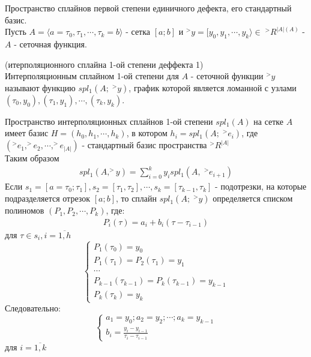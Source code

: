\documentclass[__main__.tex]{subfiles}
\begin{document}
	Пространство сплайнов первой степени единичного дефекта, его стандартный базис.\\
	
	Пусть $A = \langle a=\tau_0,\tau_1,\cdots,\tau_k = b \rangle$ - сетка $[a;b]$ и $^>y = [y_0, y_1, \cdots, y_k \rangle \in\;^>R^{|A|(A)}$ - $A$ - сеточная функция.
	\begin{definition}
		(итерполяционного сплайна 1-ой степени деффекта 1)\\
		Интерполяционным сплайном 1-ой степени для $A$ - сеточной функции $^>y$ называют функцию $spl_1\left(A;\;^>y\right)$, график которой является ломанной с узлами $(\tau_0, y_0),(\tau_1, y_1),\cdots, (\tau_k, y_k)$.
	\end{definition}
	Пространство интерполяционных сплайнов 1-ой степени $spl_1(A)$ на сетке $A$ имеет базис $H = \left(h_0,h_1,\cdots,h_k\right)$, в котором $h_i = spl_1\left(A;\;^>e_i\right)$, где $\left(^>e_1, ^>e_2,\cdots, ^>e_{|A|}\right)$ - стандартный базис пространства $^>R^{|A|}$\\
	Таким образом 
	\begin{gather*}
		spl_1\left(A,^>y\right) = \sum_{i=0}^{k}y_ispl_1\left(A,\;^>e_{i+1}\right)
	\end{gather*}
	Если $s_1 = [a=\tau_0;\tau_1], s_2=[\tau_1,\tau_2],\cdots, s_k=[\tau_{k-1},\tau_{k}]$ - подотрезки, на которые подразделяется отрезок $[a;b]$, то сплайн $spl_1\left(A;\; ^>y\right)$ определяется списком полиномов $\left(P_1,P_2,\cdots, P_k\right)$, где:
	\begin{gather*}
		P_i(\tau) = a_i+b_i(\tau-\tau_{i-1})
	\end{gather*}
	для $\tau \in s_i, i=\overline{1,h}$
	\begin{equation*}
		\begin{cases}
			P_1(\tau_0) = y_0\\
			P_1(\tau_1) = P_2(\tau_1) = y_1\\
			\cdots\\
			P_{k-1}(\tau_{k-1}) = P_k(\tau_{k-1}) = y_{k-1}\\
			P_k(\tau_{k}) = y_k
		\end{cases}
	\end{equation*}
	Следовательно:
	\begin{equation*}
		\begin{cases}
			a_1 = y_0; a_2 = y_2; \cdots; a_k = y_{k-1}\\
			b_i = \frac{y_i-y_{i-1}}{\tau_i - \tau_{i-1}}
		\end{cases}
	\end{equation*}
	для $ i = \overline{1,k}$
\end{document}
